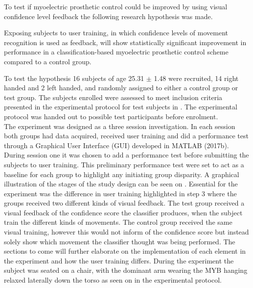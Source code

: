 To test if myoelectric prosthetic control could be improved by using visual confidence level feedback the following research hypothesis was made.  
\begin{center}
	Exposing subjects to user training, in which confidence levels of movement recognition is used as feedback, will show statistically significant improvement in performance in a classification-based myoelectric prosthetic control scheme compared to a control group.
\end{center}


To test the hypothesis 16 subjects of age 25.31 $\pm$ 1.48 were recruited, 14 right handed and 2 left handed, and randomly assigned to either a control group or test group. The subjects enrolled were assessed to meet inclusion criteria presented in the experimental protocol for test subjects in . The experimental protocol was handed out to possible test participants before enrolment. \\
The experiment was designed as a three session investigation. In each session both groups had data acquired, received user training and did a performance test through a Graphical User Interface (GUI) developed in MATLAB (2017b). During session one it was chosen to add a performance test before submitting the subjects to user training. This preliminary performance test were set to act as a baseline for each group to highlight any initiating group disparity. A graphical illustration of the stages of the study design can be seen on . Essential for the experiment was the difference in user training highlighted in step 3 where the groups received two different kinds of visual feedback. The test group received a visual feedback of the confidence score the classifier produces, when the subject train the different kinds of movements. The control group received the same visual training, however this would not inform of the confidence score but instead solely show which movement the classifier thought was being performed. The sections to come will further elaborate on the implementation of each element in the experiment and how the user training differs. During the experiment the subject was seated on a chair, with the dominant arm wearing the MYB hanging relaxed laterally down the torso as seen on  in the experimental protocol. 


